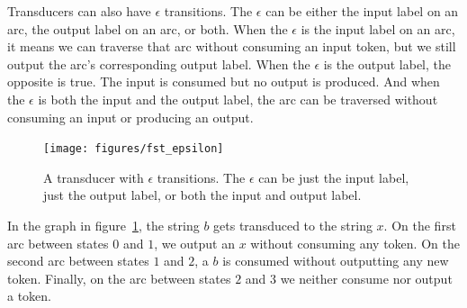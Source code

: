 Transducers can also have $\epsilon$ transitions. The $\epsilon$ can be either
the input label on an arc, the output label on an arc, or both. When the
$\epsilon$ is the input label on an arc, it means we can traverse that arc
without consuming an input token, but we still output the arc's corresponding
output label. When the $\epsilon$ is the output label, the opposite is true.
The input is consumed but no output is produced. And when the $\epsilon$ is
both the input and the output label, the arc can be traversed without consuming
an input or producing an output.

\begin{figure}
    \centering
    \texttt{[image: figures/fst\_epsilon]}
    \caption{A transducer with $\epsilon$ transitions. The $\epsilon$ can be
    just the input label, just the output label, or both the input and output
    label.}
    \label{fig:fst_epsilon}
\end{figure}

In the graph in figure~\ref{fig:fst_epsilon}, the string $b$ gets transduced to
the string $x$. On the first arc between states $0$ and $1$, we output an $x$
without consuming any token. On the second arc between states $1$ and $2$, a
$b$ is consumed without outputting any new token. Finally, on the arc between
states $2$ and $3$ we neither consume nor output a token.
